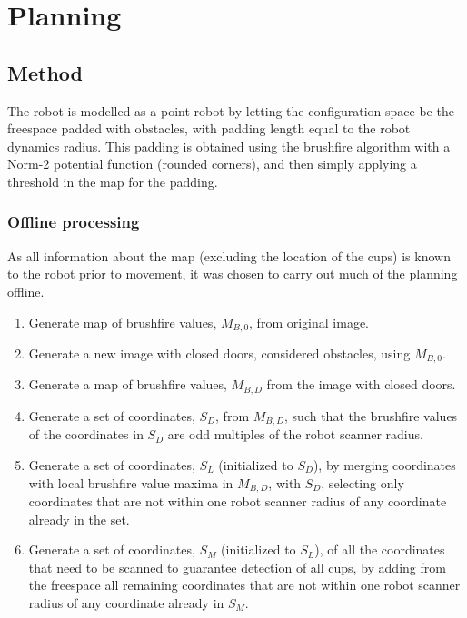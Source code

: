 \section{Planning}
\label{sec:planning}
\subsection{Method}

The robot is modelled as a point robot by letting the configuration space be the freespace padded with obstacles,
with padding length equal to the robot dynamics radius.
This padding is obtained using the brushfire algorithm with a Norm-2 potential function (rounded corners),
and then simply applying a threshold in the map for the padding.


\subsubsection{Offline processing}

As all information about the map (excluding the location of the cups) is known to the robot prior to movement,
it was chosen to carry out much of the planning offline.

\begin{enumerate}
\item Generate map of brushfire values, \(M_{B,0}\), from original image.
\item Generate a new image with closed doors, considered obstacles, using \(M_{B,0}\).
\item Generate a map of brushfire values, \(M_{B,D}\) from the image with closed doors.
\item Generate a set of coordinates, \(S_{D}\), from \(M_{B,D}\),
such that the brushfire values of the coordinates in \(S_{D}\) are odd multiples of the robot scanner radius.
\item Generate a set of coordinates, \(S_{L}\) (initialized to \(S_{D}\)), by merging coordinates with local brushfire value maxima
in \(M_{B,D}\), with \(S_{D}\), selecting only coordinates that are not within one robot scanner radius
of any coordinate already in the set.
\item Generate a set of coordinates, \(S_{M}\) (initialized to \(S_{L}\)), of all the coordinates that need to be scanned
to guarantee detection of all cups, by adding from the freespace all remaining coordinates
that are not within one robot scanner radius of any coordinate already in \(S_{M}\).
\end{enumerate}

